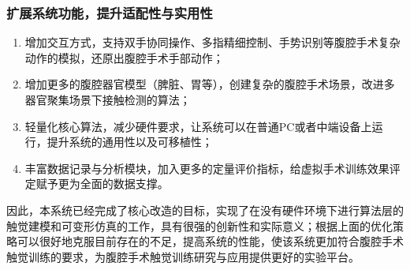\subsubsection{扩展系统功能，提升适配性与实用性}
\begin{enumerate}
    \item 增加交互方式，支持双手协同操作、多指精细控制、手势识别等腹腔手术复杂动作的模拟，还原出腹腔手术手部动作；
    \item 增加更多的腹腔器官模型（脾脏、胃等），创建复杂的腹腔手术场景，改进多器官聚集场景下接触检测的算法；
    \item 轻量化核心算法，减少硬件要求，让系统可以在普通PC或者中端设备上运行，提升系统的通用性以及可移植性；
    \item 丰富数据记录与分析模块，加入更多的定量评价指标，给虚拟手术训练效果评定赋予更为全面的数据支撑。
\end{enumerate}

因此，本系统已经完成了核心改造的目标，实现了在没有硬件环境下进行算法层的触觉建模和可变形仿真的工作，具有很强的创新性和实际意义；根据上面的优化策略可以很好地克服目前存在的不足，提高系统的性能，使该系统更加符合腹腔手术触觉训练的要求，为腹腔手术触觉训练研究与应用提供更好的实验平台。